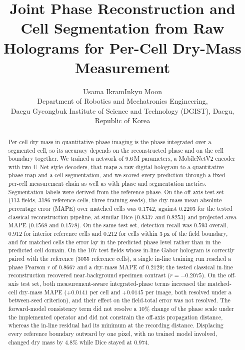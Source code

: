 \documentclass[11pt]{article}
\title{\bfseries Joint Phase Reconstruction and Cell Segmentation from Raw
Holograms for Per-Cell Dry-Mass Measurement}
\author{Usama Ikram\quad Inkyu Moon\\[2pt]
\normalsize Department of Robotics and Mechatronics Engineering,\\
\normalsize Daegu Gyeongbuk Institute of Science and Technology (DGIST),
Daegu, Republic of Korea}
\date{}
\begin{document}
\maketitle

\begin{abstract}
\noindent
Per-cell dry mass in quantitative phase imaging is the phase integrated over a
segmented cell, so its accuracy depends on the reconstructed phase and on the
cell boundary together. We trained a network of 9.6\,M parameters, a
MobileNetV2 encoder with two U-Net-style decoders, that maps a raw digital
hologram to a quantitative phase map and a cell segmentation, and we scored
every prediction through a fixed per-cell measurement chain as well as with
phase and segmentation metrics. Segmentation labels were derived from the
reference phase. On the off-axis test set (113 fields, 3186 reference cells,
three training seeds), the dry-mass mean absolute percentage error (MAPE) over
matched cells was $0.1742$, against $0.2203$ for the tested classical
reconstruction pipeline, at similar Dice ($0.8337$ and $0.8253$) and
projected-area MAPE ($0.1568$ and $0.1578$). On the same test set, detection
recall was $0.593$ overall, $0.912$ for interior reference cells and $0.212$ for
cells within 3\,px of the field boundary, and for matched cells the error lay
in the predicted phase level rather than in the predicted cell domain. On the
107 test fields whose in-line Gabor hologram is correctly paired with the
reference (3055 reference cells), a single in-line training run reached a phase
Pearson $r$ of $0.8667$ and a dry-mass MAPE of $0.2129$; the tested classical
in-line reconstruction recovered near-background specimen contrast ($r=-0.2075$). On the
off-axis test set, both measurement-aware integrated-phase terms increased the
matched-cell dry-mass MAPE ($+0.0141$ per cell and $+0.0145$ per image, both
resolved under a between-seed criterion), and their effect on the field-total
error was not resolved. The forward-model consistency term did not resolve a $10\%$
change of the phase scale under the implemented operator and did not constrain the off-axis
propagation distance, whereas the in-line residual had its minimum at the
recording distance. Displacing every reference boundary outward by one pixel,
with no trained model involved, changed dry mass by $4.8\%$ while Dice stayed at
$0.974$.
\end{abstract}

\vspace{0.6em}

\end{document}
